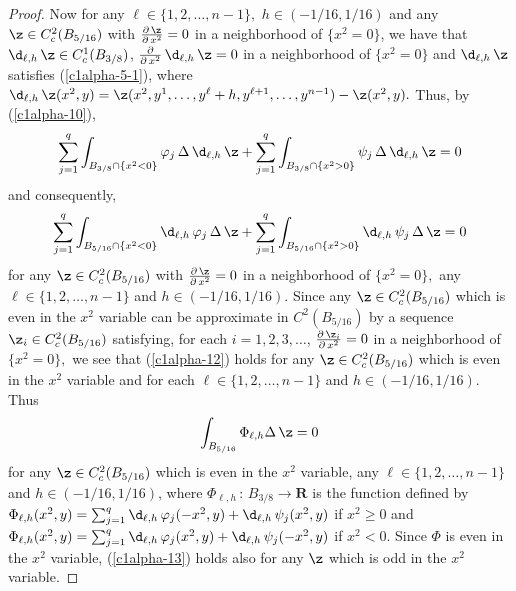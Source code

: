 \documentclass[a4paper,11pt]{amsart}
\begin{document}
\begin{proof}
Now for any $\ell \in \{1, 2, \ldots, n-1\},$ $h \in (-1/16, 1/16)$ and any 
$\z \in C^{2}_{c}(B_{5/16})$ with $\frac{\partial \, \z}{\partial \, x^{2}} = 0$ in a neighborhood 
of $\{x^{2} = 0\}$, we have that $\d_{\ell, h} \, \z \in C^{1}_{c}(B_{3/8})$, 
$\frac{\partial}{\partial \, x^{2}} \, \d_{\ell, h} \, \z= 0$ in a neighborhood of $\{x^{2} = 0\}$ and $\d_{\ell, h} \, \z$ satisfies (\ref{c1alpha-5-1}), 
where $\d_{\ell, h} \, \z (x^{2}, y) = \z(x^{2}, y^{1}, \ldots, y^{\ell} + h, y^{\ell +1}, \ldots, y^{n-1}) - \z(x^{2}, y).$
Thus, by (\ref{c1alpha-10}), 
\begin{equation*}\label{c1alpha-11}
\sum_{j=1}^{q}\int_{B_{3/8} \cap \{x^{2} < 0\}} \varphi_{j} \,\Delta \, \d_{\ell, h} \, \z + 
\sum_{j=1}^{q} \int_{B_{3/8} \cap \{x^{2} > 0\}} \psi_{j} \, \Delta \, \d_{\ell, h} \, \z  = 0
\end{equation*}
and consequently,
\begin{equation}\label{c1alpha-12}
\sum_{j=1}^{q}\int_{B_{5/16} \cap \{x^{2} < 0\}} \d_{\ell, h} \, \varphi_{j} \,\Delta \,  \z + 
\sum_{j=1}^{q} \int_{B_{5/16} \cap \{x^{2} > 0\}} \d_{\ell, h} \, \psi_{j} \, \Delta \, \z  = 0
\end{equation}
for  any $\z \in C^{2}_{c}(B_{5/16})$ with $\frac{\partial \, \z}{\partial \, x^{2}} = 0$ in a neighborhood 
of $\{x^{2} = 0\},$ any $\ell \in \{1, 2, \ldots, n-1\}$ and $h \in (-1/16, 1/16).$ Since any 
$\z \in C^{2}_{c}(B_{5/16})$ which is even in the $x^{2}$ variable can be approximate in $C^{2}(B_{5/16})$ by 
a sequence $\z_{i} \in C^{2}_{c}(B_{5/16})$ satisfying, for each $i = 1, 2, 3, \ldots$, 
$\frac{\partial \, \z_{i}}{\partial \, x^{2}} = 0$ in a neighborhood of $\{x^{2} = 0\},$ we see that 
(\ref{c1alpha-12}) holds for any $\z \in C^{2}_{c}(B_{5/16})$ which is even in the $x^{2}$ variable and 
for each $\ell \in \{1, 2, \ldots, n-1\}$ and $h \in (-1/16, 1/16).$ Thus 
\begin{equation}\label{c1alpha-13}
\int_{B_{5/16}} \Phi_{\ell, h} \Delta \, \z = 0
\end{equation}
for any $\z \in C^{2}_{c}(B_{5/16})$ which is even in the $x^{2}$ variable, any 
$\ell \in \{1, 2, \ldots, n-1\}$ and $h \in (-1/16, 1/16)$, where $\Phi_{\ell, h} \, : \, B_{3/8} \to {\mathbf R}$ is the function defined by
$\Phi_{\ell, h}(x^{2}, y) = \sum_{j=1}^{q} \d_{\ell, h} \, \varphi_{j}(-x^{2}, y) + \d_{\ell, h} \, \psi_{j}(x^{2}, y)$ if $x^{2} \geq 0$ and 
$\Phi_{\ell, h}(x^{2}, y) = \sum_{j=1}^{q} \d_{\ell, h} \, \varphi_{j}(x^{2}, y) + \d_{\ell, h} \, \psi_{j}(-x^{2}, y)$ if $x^{2} <0.$ Since $\Phi$ is even in the $x^{2}$ variable, (\ref{c1alpha-13}) holds also for any $\z$ which is odd in the $x^{2}$ variable.

\end{proof}
\end{document}
